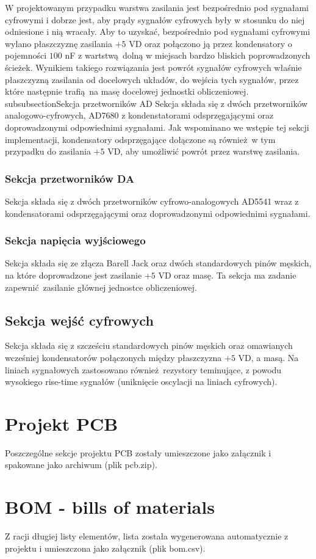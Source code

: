 \documentclass{scrartcl}
\begin{document}
W projektowanym przypadku warstwa zasilania jest bezpośrednio pod sygnałami cyfrowymi i dobrze jest, aby prądy sygnałów cyfrowych były w stosunku do niej odniesione i nią wracały. Aby to uzyskać, bezpośrednio pod sygnałami cyfrowymi wylano płaszczyznę zasilania $+5$ VD oraz połączono ją przez kondensatory o pojemności $100$ nF z wartstwą dolną w miejsach bardzo bliskich poprowadzonych ścieżek. Wynikiem takiego rozwiązania jest powrót sygnałów cyfrowych właśnie płaszczyzną zasilania od docelowych układów, do wejścia tych sygnałów, przez które następnie trafią na masę docelowej jednostki obliczeniowej.
subsubsection{Sekcja przetworników AD}
Sekcja składa się z dwóch przetworników analogowo-cyfrowych, AD7680 z kondenstatorami odsprzęgającymi oraz doprowadzonymi odpowiednimi sygnałami. Jak wspominano we wstępie tej sekcji implementacji, kondensatory odsprzęgające dołączone są również w tym przypadku do zasilania $+5$ VD, aby umożliwić powrót przez warstwę zasilania.
\subsubsection{Sekcja przetworników DA}
Sekcja składa się z dwóch przetworników cyfrowo-analogowych AD5541 wraz z kondensatorami odsprzęgającymi oraz doprowadzonymi odpowiednimi sygnałami.
\subsubsection{Sekcja napięcia wyjściowego}
Sekcja składa się ze złącza Barell Jack oraz dwóch standardowych pinów męskich, na które doprowadzone jest zasilanie $+5$ VD oraz masę. Ta sekcja ma zadanie zapewnić zasilanie głównej jednostce obliczeniowej.
\subsection{Sekcja wejść cyfrowych}
Sekcja składa się z szcześciu standardowych pinów męskich oraz omawianych wcześniej kondensatorów połączonych między płaszczyzna $+5$ VD, a masą. Na liniach sygnałowych zastosowano również rezystory teminujące, z powodu wysokiego rise-time sygnałów (uniknięcie oscylacji na liniach cyfrowych).
\section{Projekt PCB}
Poszczególne sekcje projektu PCB zostały umieszczone jako załącznik i spakowane jako archiwum (plik pcb.zip).
\section{BOM - bills of materials}
Z racji długiej listy elementów, lista została wygenerowana automatycznie z projektu i umieszczona jako załącznik (plik bom.csv). 
\end{document}
